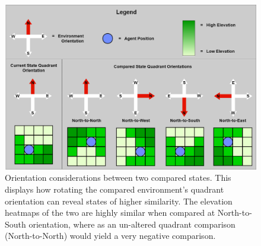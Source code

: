 
\begin{figure}[!htb]
  \centering
  \includegraphics[width=1.0\columnwidth]{Figures/quadrant_orientations.png}
  \caption[State Comparison Orientations]{Orientation considerations between two compared states. This displays how rotating the compared environment's quadrant orientation can reveal states of higher similarity. The elevation heatmaps of the two are highly similar when compared at North-to-South orientation, where as an un-altered quadrant comparison (North-to-North) would yield a very negative comparison.}
  \label{fig:quadrant_orientations}
\end{figure}

